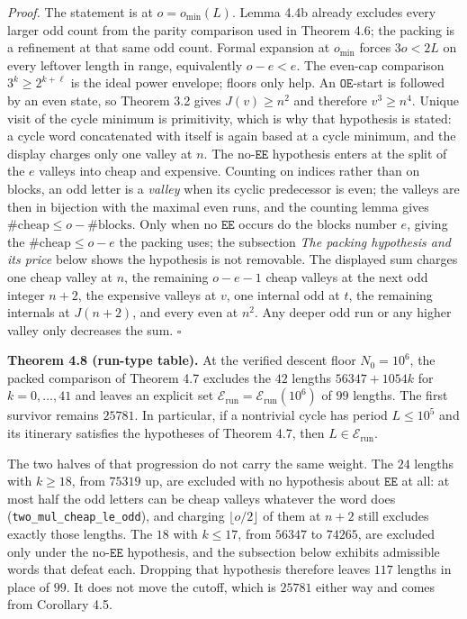\documentclass[12pt]{article}
\begin{document}
\emph{Proof.} The statement is at \(o=o_{\min}(L)\). Lemma 4.4b already
excludes every larger odd count from the parity comparison used in
Theorem 4.6; the packing is a refinement at that same odd count. Formal
expansion at \(o_{\min}\) forces \(3o<2L\) on every leftover length in
range, equivalently \(o-e<e\). The even-cap comparison
\(3^k\ge 2^{k+\ell}\) is the ideal power envelope; floors only help. An
\(\mathtt{OE}\)-start is followed by an even state, so Theorem 3.2 gives
\(J(v)\ge n^2\) and therefore \(v^3\ge n^4\). Unique visit of the cycle
minimum is primitivity, which is why that hypothesis is stated: a cycle
word concatenated with itself is again based at a cycle minimum, and the
display charges only one valley at \(n\). The no-\(\mathtt{EE}\)
hypothesis enters at the split of the \(e\) valleys into cheap and
expensive. Counting on indices rather than on blocks, an odd letter is a
\emph{valley} when its cyclic predecessor is even; the valleys are then
in bijection with the maximal even runs, and the counting lemma gives
\(\#\text{cheap}\le o-\#\text{blocks}\). Only when no \(\mathtt{EE}\)
occurs do the blocks number \(e\), giving the \(\#\text{cheap}\le o-e\)
the packing uses; the subsection \emph{The packing hypothesis and its
price} below shows the hypothesis is not removable. The displayed sum
charges one cheap valley at \(n\), the remaining \(o-e-1\) cheap valleys
at the next odd integer \(n+2\), the expensive valleys at \(v\), one
internal odd at \(t\), the remaining internals at \(J(n+2)\), and every
even at \(n^2\). Any deeper odd run or any higher valley only decreases
the sum. \(\square\)

\textbf{Theorem 4.8 (run-type table).} At the verified descent floor
\(N_0=10^6\), the packed comparison of Theorem 4.7 excludes the \(42\)
lengths \(56347+1054k\) for \(k=0,\ldots,41\) and leaves an explicit set
\(\mathcal E_{\mathrm{run}}=\mathcal E_{\mathrm{run}}(10^6)\) of \(99\)
lengths. The first survivor remains \(25781\). In particular, if a
nontrivial cycle has period \(L\le 10^5\) and its itinerary satisfies
the hypotheses of Theorem 4.7, then \(L\in\mathcal E_{\mathrm{run}}\).

The two halves of that progression do not carry the same weight. The
\(24\) lengths with \(k\ge 18\), from \(75319\) up, are excluded with no
hypothesis about \(\mathtt{EE}\) at all: at most half the odd letters
can be cheap valleys whatever the word does
(\texttt{\nolinkurl{two_mul_cheap_le_odd}}), and charging
\(\lfloor o/2\rfloor\) of them at \(n+2\) still excludes exactly those
lengths. The \(18\) with \(k\le 17\), from \(56347\) to \(74265\), are
excluded only under the no-\(\mathtt{EE}\) hypothesis, and the
subsection below exhibits admissible words that defeat each. Dropping
that hypothesis therefore leaves \(117\) lengths in place of \(99\). It
does not move the cutoff, which is \(25781\) either way and comes from
Corollary 4.5.
\end{document}
